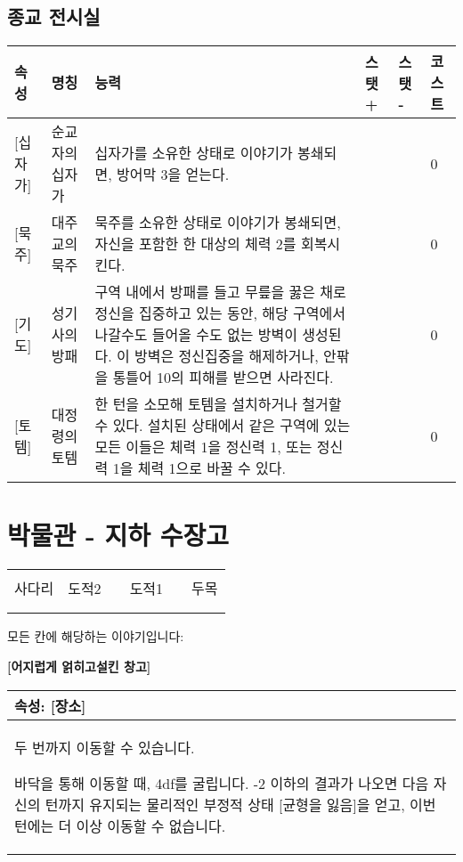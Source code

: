 \documentclass[12pt]{report}
\newenvironment{story}[2]
{\begin{center}
		{\large \textbf{[#1]}}\\[1ex]
		\begin{tabular}{|p{\textwidth}|}
			\hline
			\textbf{속성}: #2
			\\
			\hline
		}
		{
			\\\hline
		\end{tabular}
	\end{center}
}
\begin{document}
	\section*{종교 전시실}
		\begin{tabularx}{\textwidth}{l|l|X|l|l|l}
			\textbf{속성} & \textbf{명칭} & \textbf{능력} & \textbf{스탯 +} & \textbf{스탯 -} & \textbf{코스트}\\ \hline \hline
			[신성][십자가]& 순교자의 십자가 & 십자가를 소유한 상태로 이야기가 봉쇄되면, 방어막 3을 얻는다. &  & & 0 \\ \hline
			[신성][묵주]& 대주교의 묵주 & 묵주를 소유한 상태로 이야기가 봉쇄되면, 자신을 포함한 한 대상의 체력 2를 회복시킨다. &  & & 0 \\ \hline
			[신성][기도]& 성기사의 방패 & 구역 내에서 방패를 들고 무릎을 꿇은 채로 정신을 집중하고 있는 동안, 해당 구역에서 나갈수도 들어올 수도 없는 방벽이 생성된다. 이 방벽은 정신집중을 해제하거나, 안팎을 통틀어 10의 피해를 받으면 사라진다.  &  & & 0 \\ \hline
			[신성][토템]& 대정령의 토템 & 한 턴을 소모해 토템을 설치하거나 철거할 수 있다. 설치된 상태에서 같은 구역에 있는 모든 이들은 체력 1을 정신력 1, 또는 정신력 1을 체력 1으로 바꿀 수 있다. &  & & 0 \\
		\end{tabularx}
	
	\chapter{박물관 - 지하 수장고}
	\begin{tabular}{|p{2cm}|p{2cm}|p{2cm}|p{2cm}|p{2cm}|p{2cm}|}
		\hline
		&     &  &     &  &    \\ \hline
		&     &  &     &  &    \\ \hline
		사다리 & 도적2 &  & 도적1 &  & 두목 \\ \hline
		&     &  &     &  &    \\ \hline
		&     &  &     &  &    \\ \hline
	\end{tabular}
	
	모든 칸에 해당하는 이야기입니다:
	\begin{story}{어지럽게 얽히고설킨 창고}{[장소]}
		두 번까지 이동할 수 있습니다.
		
		바닥을 통해 이동할 때, 4df를 굴립니다. -2 이하의 결과가 나오면 다음 자신의 턴까지 유지되는 물리적인 부정적 상태 [균형을 잃음]을 얻고, 이번 턴에는 더 이상 이동할 수 없습니다.
	\end{story}
	
\end{document}
